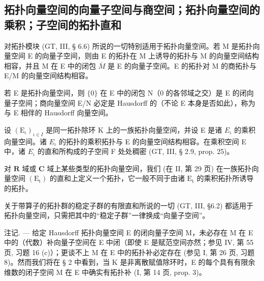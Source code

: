 \subsection{拓扑向量空间的向量子空间与商空间；拓扑向量空间的乘积；子空间的拓扑直和}

对拓扑模块 (GT, III, § 6.6) 所说的一切特别适用于拓扑向量空间。若 M 是拓扑向量空间 E 的向量子空间，则由 E 的拓扑在 M 上诱导的拓扑与 M 的向量空间结构相容，并且 M 在 E 中的闭包 \(\overline{M}\) 是 E 的向量子空间。E 的拓扑对 M 的商拓扑与 E/M 的向量空间结构相容。

若 E 是拓扑向量空间，则 \(\{0\}\) 在 E 中的闭包 N（0 的各邻域之交）是 E 的闭向量子空间；商向量空间 E/N 必定是 Hausdorff 的（不论 E 本身是否如此），称为与 E 相伴的 Hausdorff 向量空间。

设 \((\mathrm{E}_{\iota})_{\iota \in I}\) 是同一拓扑除环 K 上的一族拓扑向量空间，并设 E 是诸 \(E_{\iota}\) 的乘积向量空间。诸 \(E_{\iota}\) 的拓扑的乘积拓扑与 E 的向量空间结构相容。在乘积空间 E 中，诸 \(E_{\iota}\) 的直和所构成的子空间 F 处处稠密 (GT, III, § 2.9, prop. 25)。

对 \(\mathbf{R}\) 域或 \(\mathbf{C}\) 域上某些类型的拓扑向量空间，我们 (在 II, 第 29 页) 在一族拓扑向量空间 \((\mathrm{E}_{\mathrm{t}})\) 的直和上定义一个拓扑，它一般不同于由诸 \(\mathrm{E}_{\mathrm{t}}\) 的乘积拓扑所诱导的拓扑。

关于带算子的拓扑群的稳定子群的有限直和所说的一切 (GT, III, §6.2) 都适用于拓扑向量空间，只需把其中的“稳定子群”一律换成“向量子空间”。

注记. --- 给定 Hausdorff 拓扑向量空间 E 的闭向量子空间 M，未必存在 M 在 E 中的（代数）补向量子空间在 E 中闭（即使 E 是赋范空间亦然；参见 IV, 第 55 页, 习题 16 (c)）；更谈不上 M 在 E 中的拓扑补必定存在 (参见 I, 第 26 页, 习题 8)。然而我们将在 § 2 中看到，当 K 是非离散赋值除环时，E 的每个具有有限余维数的闭子空间 M 在 E 中确实有拓扑补 (I, 第 14 页, prop. 3)。

